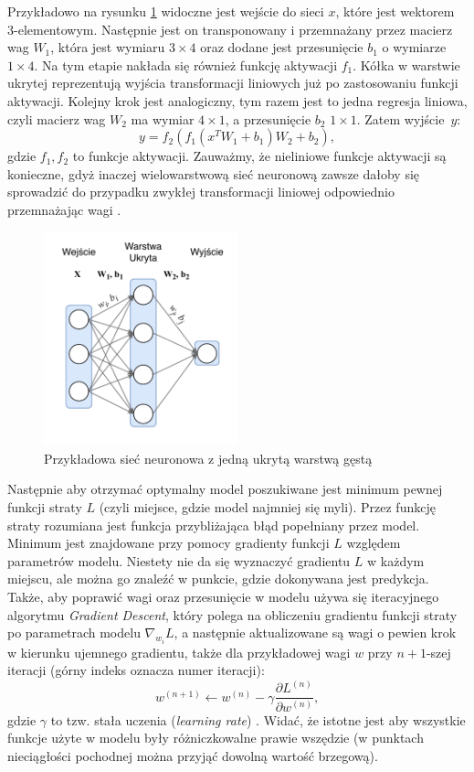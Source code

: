 \documentclass{pracalicmgr}
\begin{document}
	 Przykładowo na rysunku \ref{fig:simple} widoczne jest wejście do sieci $x$, które jest wektorem 3-elementowym. Następnie jest on transponowany i przemnażany przez macierz wag $W_1$, która jest wymiaru $3\times4$ oraz dodane jest przesunięcie $b_1$ o wymiarze $1\times4$. Na tym etapie nakłada się również funkcję aktywacji $f_1$. Kółka w warstwie ukrytej reprezentują wyjścia transformacji liniowych już po zastosowaniu funkcji aktywacji. Kolejny krok jest analogiczny, tym razem jest to jedna regresja liniowa, czyli macierz wag $W_2$ ma wymiar $4\times1$, a przesunięcie $b_2$ $1\times1$. Zatem wyjście~$y$: $$y = f_2(f_1(x^TW_1 + b_1)W_2 + b_2),$$ gdzie $f_1, f_2$ to funkcje aktywacji. Zauważmy, że nieliniowe funkcje aktywacji są konieczne, gdyż inaczej wielowarstwową sieć neuronową zawsze dałoby się sprowadzić do przypadku zwykłej transformacji liniowej odpowiednio przemnażając wagi \cite{dl}.
	
	\begin{figure}[H]
	\centering
	\includegraphics[width=0.5\textwidth]{simple_nn.pdf}
	\caption{Przykładowa sieć neuronowa z jedną ukrytą warstwą gęstą}
	\label{fig:simple}
	\end{figure}
	
	Następnie aby otrzymać optymalny model poszukiwane jest minimum pewnej funkcji straty $L$ (czyli miejsce, gdzie model najmniej się myli). Przez funkcję straty rozumiana jest funkcja przybliżająca błąd popełniany przez model. Minimum jest znajdowane przy pomocy gradienty funkcji $L$ względem parametrów modelu. Niestety nie da się wyznaczyć gradientu $L$ w każdym miejscu, ale można go znaleźć w punkcie, gdzie dokonywana jest predykcja. Także, aby poprawić wagi oraz przesunięcie w modelu używa się iteracyjnego algorytmu \textit{Gradient Descent}, który polega na obliczeniu gradientu funkcji straty po parametrach modelu $\nabla_{w_i}L$, a następnie aktualizowane są wagi o pewien krok w kierunku ujemnego gradientu, także dla przykładowej wagi $w$ przy $n+1$-szej iteracji (górny indeks oznacza numer iteracji): $$w^{(n+1)} \leftarrow w^{(n)} - \gamma \frac{\partial L^{(n)}}{\partial w^{(n)}},$$ gdzie $\gamma$ to tzw. stała uczenia (\textit{learning rate}) \cite{dl}. Widać, że istotne jest aby wszystkie funkcje użyte w modelu były różniczkowalne prawie wszędzie (w punktach nieciągłości pochodnej można przyjąć dowolną wartość brzegową). 
	
\end{document}
